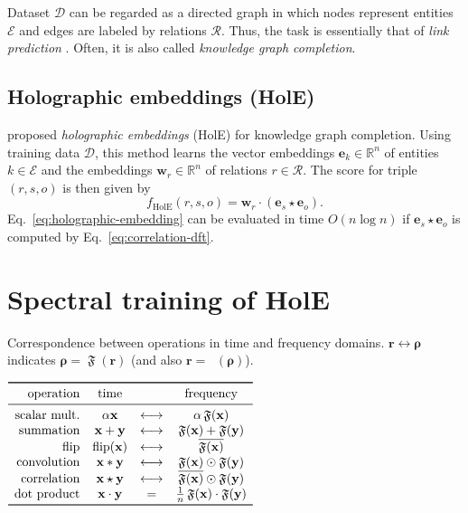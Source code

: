 \documentclass[11pt,a4paper]{article}
\def\mat#1{\boldsymbol{\mathbf{#1}}}
\def\Rset{\mathbb{R}}
\let\cconv*
\let\ccorr\star
\let\hprod\odot
\def\DFT{\mathop{\mathfrak{F}}}
\def\IDFT{\mathop{\mathfrak{F}^{-1}}}
\def\flip{\mathop{\text{flip}}}
\begin{document}
Dataset $\mathcal{D}$ can be regarded as a directed graph
in which nodes represent entities $\mathcal{E}$ and edges are labeled by relations $\mathcal{R}$.
Thus, the task is essentially that of \emph{link prediction} \citep{Liben-Nowell:03,Hasan:11}.
Often, it is also called
\emph{knowledge graph completion}.

\subsection{Holographic embeddings (HolE)}
\label{sec:holographic-embedding}

\citet{Nickel:16} proposed \emph{holographic embeddings} (HolE) 
for knowledge graph completion.
Using training data $\mathcal{D}$,
this method learns
the vector embeddings
$\mat{e}_k \in\Rset^n$ of entities $k \in \mathcal{E}$
and the embeddings
$\mat{w}_r \in \Rset^n$ of relations $r \in \mathcal{R}$.
The score for triple $(r,s,o)$ is then given by
\begin{equation}
  \label{eq:holographic-embedding}
  f_{\text{HolE}}(r,s,o) = \mat{w}_r \cdot ( \mat{e}_s  \ccorr \mat{e}_o).
\end{equation}
Eq.~\eqref{eq:holographic-embedding} can be evaluated 
in time $O(n \log n)$
if $\mat{e}_s \ccorr \mat{e}_o$ is computed
by Eq.~\eqref{eq:correlation-dft}.


\section{Spectral training of HolE}
\label{sec:proposed}

\begin{table}[tb]
  \centering
  \caption{Correspondence between operations in time and frequency domains.
    $\mat{r} \leftrightarrow \mat{\rho}$ indicates $\mat{\rho}=\DFT(\mat{r})$
    (and also $\mat{r}=\IDFT(\mat{\rho})$).}
  \label{tab:correspondence}
  $
  \begin{array}{r c @{\quad} c @{\quad} c}
    \toprule
    \text{operation}    & \text{time}            &                     & \text{frequency}                              \\
    \midrule
    \text{scalar mult.} & \alpha \mat{x}         & \longleftrightarrow & \alpha \DFT(\mat{x})                          \\
    \text{summation}    & \mat{x} + \mat{y}      & \longleftrightarrow & \DFT(\mat{x}) + \DFT(\mat{y})                 \\
    \text{flip}         & \flip(\mat{x})         & \longleftrightarrow & \overline{\DFT(\mat{x})}                      \\
    \text{convolution}  & \mat{x} \cconv \mat{y} & \longleftrightarrow & \DFT(\mat{x}) \hprod \DFT(\mat{y})            \\
    \text{correlation}  & \mat{x} \ccorr \mat{y} & \longleftrightarrow & \overline{\DFT(\mat{x})} \hprod \DFT(\mat{y}) \\
    \text{dot product}  & \mat{x} \cdot \mat{y}  & =                   & \frac{1}{n} \DFT(\mat{x}) \cdot \DFT(\mat{y}) \\
    \bottomrule
  \end{array}
  $
\end{table}
\end{document}
